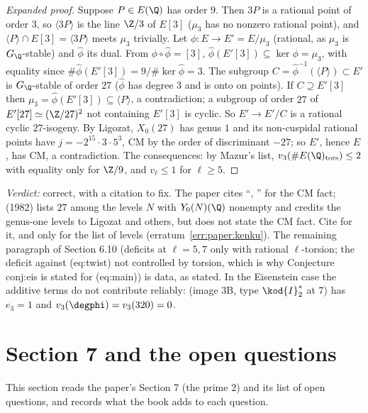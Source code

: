 \begin{sloppypar}
\begin{proof}[Expanded proof]
Suppose $P\in E(\Q)$ has order $9$. Then $3P$ is a rational point of order $3$, so $\langle3P\rangle$ is the line $\Z/3$ of $E[3]$ ($\mu_3$ has no nonzero rational point), and $\langle P\rangle\cap E[3]=\langle3P\rangle$
meets $\mu_3$ trivially. Let $\phi\colon E\to E'=E/\mu_3$ (rational, as $\mu_3$ is $G_\Q$-stable) and $\hat\phi$ its dual. From $\phi\circ\hat\phi=[3]$, $\hat\phi(E'[3])\subseteq\ker\phi=\mu_3$, with equality since
$\#\hat\phi(E'[3])=9/\#\ker\hat\phi=3$. The subgroup $C=\hat\phi^{-1}(\langle P\rangle)\subset E'$ is $G_\Q$-stable of order $27$ ($\hat\phi$ has degree $3$ and is onto on points). If $C\supseteq E'[3]$ then
$\mu_3=\hat\phi(E'[3])\subseteq\langle P\rangle$, a contradiction; a subgroup of order $27$ of $E'[27]\simeq(\Z/27)^2$ not containing $E'[3]$ is cyclic. So $E'\to E'/C$ is a rational cyclic $27$-isogeny. By
Ligozat, $X_0(27)$ has genus $1$ and its non-cuspidal rational points have $j=-2^{15}\cdot3\cdot5^3$, CM by the order of discriminant $-27$; so $E'$, hence $E$, has CM, a contradiction. The
consequences: by Mazur's list, $v_3(\#E(\Q)_{\mathrm{tors}})\le2$ with equality only for $\Z/9$, and $v_\ell\le1$ for $\ell\ge5$.
\end{proof}

\noindent\emph{Verdict:} correct, with a citation to fix. The paper cites ``\cite{Ligozat75}, \cite{Kenku}'' for the CM fact; \cite{Kenku} (1982) lists $27$ among the levels $N$ with $Y_0(N)(\Q)$
nonempty and credits the genus-one levels to Ligozat and others, but does not state the CM fact. Cite \cite{Ligozat75} for it, and \cite{Kenku} only for the list of levels
(erratum~\ref{err:paper:kenku}). The remaining paragraph of Section 6.10 (deficits at $\ell=5,7$ only with rational $\ell$-torsion; the deficit against (eq:twist) not controlled by torsion,
which is why Conjecture conj:eis is stated for (eq:main)) is data, as stated. In the Eisenstein case the additive terms do not contribute reliably:  (image 3B, type $\kod{I}_2^*$ at $7$)
has $e_3=1$ and $v_3(\degphi)=v_3(320)=0$.

\section[Paper 7 and open questions]{Section 7 and the open questions}\label{sec:paper:two-open}

This section reads the paper's Section 7 (the prime $2$) and its list of open questions, and records what the book adds to each question.


\end{sloppypar}
